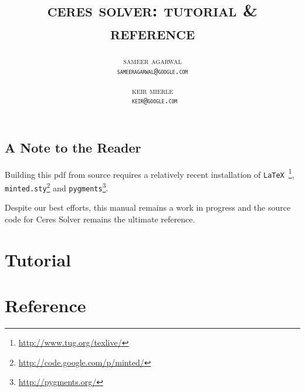 \documentclass[11pt,letterpaper,oneside]{memoir}
\title{\Huge\scshape
\MakeLowercase{Ceres Solver:  Tutorial \& Reference}
}
\author{
\scshape\MakeLowercase{Sameer Agarwal} \\ \texttt{sameeragarwal@google.com} 
\and 
\scshape\MakeLowercase{Keir Mierle} \\  \texttt{ keir@google.com}
}
\begin{document}
\maketitle
\thispagestyle{empty}
\newpage
\pagestyle{ceres}
\tableofcontents
\newpage

\chapter{A Note to the Reader}
Building this pdf from source requires a relatively recent installation of \texttt{LaTeX}~\footnote{\url{http://www.tug.org/texlive/}}, \texttt{minted.sty}\footnote{\url{http://code.google.com/p/minted/}} and \texttt{pygments}\footnote{\url{http://pygments.org/}}.

Despite our best efforts, this manual remains a work in progress and the source code for Ceres Solver remains the ultimate reference.





\part{Tutorial}
\label{part:tutorial}






\part{Reference}
\label{part:reference}








\end{document}
